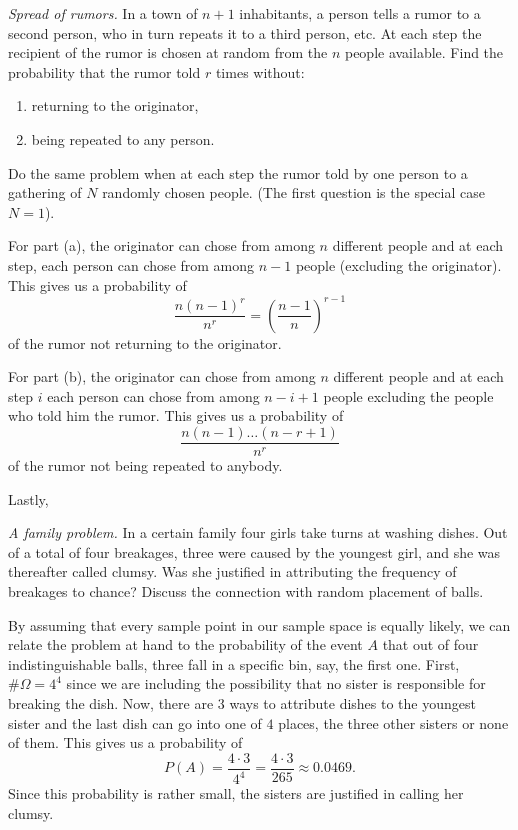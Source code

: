 \begin{problem}[Handout 2, \# 13]
  \emph{Spread of rumors.} In a town of \(n+1\) inhabitants, a person tells
  a rumor to a second person, who in turn repeats it to a third person,
  etc. At each step the recipient of the rumor is chosen at random from the
  \(n\) people available. Find the probability that the rumor told \(r\)
  times without:
  \begin{enumerate}[label=(\alph*),noitemsep]
  \item returning to the originator,
  \item being repeated to any person.
  \end{enumerate}
  Do the same problem when at each step the rumor told by one person to a
  gathering of \(N\) randomly chosen people. (The first question is the
  special case \(N=1\)).
\end{problem}
\begin{solution}
  For part (a), the originator can chose from among \(n\) different people
  and at each step, each person can chose from among \(n-1\) people
  (excluding the originator). This gives us a probability of
  \[
    \frac{n(n-1)^r}{n^r}=\left(\frac{n-1}{n}\right)^{r-1}
  \]
  of the rumor not returning to the originator.

  For part (b), the originator can chose from among \(n\) different people
  and at each step \(i\) each person can chose from among \(n-i+1\) people
  excluding the people who told him the rumor. This gives us a probability
  of
  \[
    \frac{n(n-1)\dotsc(n-r+1)}{n^r}
  \]
  of the rumor not being repeated to anybody.

  Lastly,
\end{solution}
\newpage

\begin{problem}[Handout 2, \# 14]
  \emph{A family problem.} In a certain family four girls take turns at
  washing dishes. Out of a total of four breakages, three were caused by
  the youngest girl, and she was thereafter called clumsy. Was she
  justified in attributing the frequency of breakages to chance? Discuss
  the connection with random placement of balls.
\end{problem}
\begin{solution}
  By assuming that every sample point in our sample space is equally
  likely, we can relate the problem at hand to the probability of the event
  \(A\) that out of four indistinguishable balls, three fall in a specific
  bin, say, the first one. First, \(\#\Omega=4^4\) since we are including
  the possibility that no sister is responsible for breaking the dish. Now,
  there are \(3\) ways to attribute dishes to the youngest sister and the
  last dish can go into one of \(4\) places, the three other sisters or
  none of them. This gives us a probability of
  \[
    P(A)=\frac{4\cdot 3}{4^4}=\frac{4\cdot 3}{265}\approx 0.0469.
  \]
  Since this probability is rather small, the sisters are justified in
  calling her clumsy.
\end{solution}
\newpage

